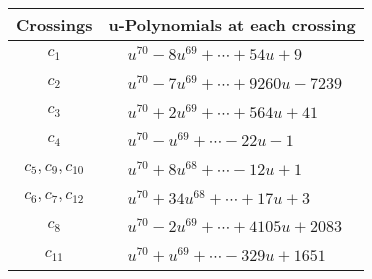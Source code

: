 \documentclass[1p]{elsarticle_modified}
\theoremstyle{definition}
\begin{document}
\begin{tabular}{m{50pt}|m{274pt}}
Crossings & \hspace{64pt}u-Polynomials at each crossing \\
\hline $$\begin{aligned}c_{1}\end{aligned}$$&$\begin{aligned}
&u^{70}-8 u^{69}+\cdots+54 u+9
\end{aligned}$\\
\hline $$\begin{aligned}c_{2}\end{aligned}$$&$\begin{aligned}
&u^{70}-7 u^{69}+\cdots+9260 u-7239
\end{aligned}$\\
\hline $$\begin{aligned}c_{3}\end{aligned}$$&$\begin{aligned}
&u^{70}+2 u^{69}+\cdots+564 u+41
\end{aligned}$\\
\hline $$\begin{aligned}c_{4}\end{aligned}$$&$\begin{aligned}
&u^{70}- u^{69}+\cdots-22 u-1
\end{aligned}$\\
\hline $$\begin{aligned}c_{5},c_{9},c_{10}\end{aligned}$$&$\begin{aligned}
&u^{70}+8 u^{68}+\cdots-12 u+1
\end{aligned}$\\
\hline $$\begin{aligned}c_{6},c_{7},c_{12}\end{aligned}$$&$\begin{aligned}
&u^{70}+34 u^{68}+\cdots+17 u+3
\end{aligned}$\\
\hline $$\begin{aligned}c_{8}\end{aligned}$$&$\begin{aligned}
&u^{70}-2 u^{69}+\cdots+4105 u+2083
\end{aligned}$\\
\hline $$\begin{aligned}c_{11}\end{aligned}$$&$\begin{aligned}
&u^{70}+u^{69}+\cdots-329 u+1651
\end{aligned}$\\
\hline
\end{tabular}\\~\\
\end{document}
